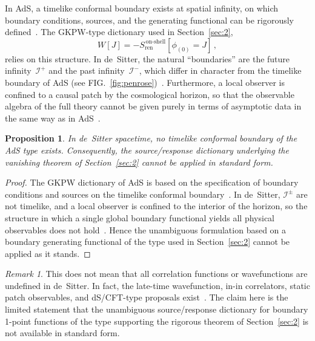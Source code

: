 \documentclass[
  aps,
  prd,
  preprint,
  groupedaddress,
  nofootinbib,
  longbibliography
]{revtex4-2}
\newtheorem{proposition}[definition]{Proposition}
\theoremstyle{remark}
\newtheorem{remark}[definition]{Remark}
\begin{document}
In AdS, a timelike conformal boundary exists at spatial infinity,
on which boundary conditions, sources, and the generating
functional can be rigorously
defined~\cite{ref2,ref3,ref9,ref10,ref11}.
The GKPW-type dictionary used in Section~\ref{sec:2},
\begin{equation}\label{eq:GKPW-dS}
  W[J] = -S_{\mathrm{ren}}^{\,\mathrm{on\text{-}shell}}%
    [\phi_{(0)}=J]\,,
\end{equation}
relies on this structure.
In de~Sitter, the natural ``boundaries'' are the future
infinity~$\mathcal{I}^+$ and the past infinity~$\mathcal{I}^-$,
which differ in character from the timelike boundary of
AdS (see FIG.~\ref{fig:penrose})~\cite{ref16,ref17,ref18,ref19,ref20,ref21}.
Furthermore, a local observer is confined to a causal patch by
the cosmological horizon, so that the observable algebra of the
full theory cannot be given purely in terms of asymptotic data in
the same way as in
AdS~\cite{ref16,ref17,ref19,ref20,ref21}.

\begin{proposition}\label{prop:no-boundary-functional}
In de~Sitter spacetime, no timelike conformal boundary of the
AdS type exists.
Consequently, the source/response dictionary underlying the
vanishing theorem of Section~\ref{sec:2} cannot be applied
in standard form.
\end{proposition}

\begin{proof}
The GKPW dictionary of AdS is based on the specification of
boundary conditions and sources on the timelike conformal
boundary~\cite{ref2,ref3}.
In de~Sitter, $\mathcal{I}^\pm$ are not timelike, and a local
observer is confined to the interior of the horizon, so the
structure in which a single global boundary functional yields all
physical observables does not
hold~\cite{ref16,ref17,ref18,ref19,ref20,ref21}.
Hence the unambiguous formulation based on a boundary generating
functional of the type used in Section~\ref{sec:2} cannot be
applied as it stands.
\end{proof}

\begin{remark}\label{rem:dS-not-undefined}
This does not mean that all correlation functions or wavefunctions
are undefined in de~Sitter.
In fact, the late-time wavefunction, in-in correlators, static
patch observables, and dS/CFT-type proposals
exist~\cite{ref18,ref19,ref20,ref21,ref24,ref25}.
The claim here is the limited statement that the unambiguous
source/response dictionary for boundary 1-point functions of the
type supporting the rigorous theorem of Section~\ref{sec:2} is not
available in standard form.
\end{remark}
\end{document}
